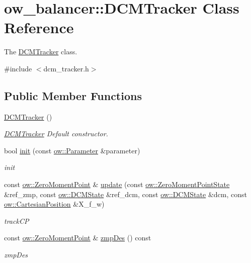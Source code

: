 \hypertarget{classow__balancer_1_1DCMTracker}{}\section{ow\+\_\+balancer\+:\+:D\+C\+M\+Tracker Class Reference}
\label{classow__balancer_1_1DCMTracker}


The \hyperlink{classow__balancer_1_1DCMTracker}{D\+C\+M\+Tracker} class.  




{\ttfamily \#include $<$dcm\+\_\+tracker.\+h$>$}

\subsection*{Public Member Functions}
\begin{DoxyCompactItemize}
\item 
\hyperlink{classow__balancer_1_1DCMTracker_a07ed7819c7459f06b6b33d957c230cdb}{D\+C\+M\+Tracker} ()\hypertarget{classow__balancer_1_1DCMTracker_a07ed7819c7459f06b6b33d957c230cdb}{}\label{classow__balancer_1_1DCMTracker_a07ed7819c7459f06b6b33d957c230cdb}

\begin{DoxyCompactList}\small\item\em \hyperlink{classow__balancer_1_1DCMTracker}{D\+C\+M\+Tracker} Default constructor. \end{DoxyCompactList}\item 
bool \hyperlink{classow__balancer_1_1DCMTracker_a7ed7f64b3d05d2636593c9e9270b73ce}{init} (const \hyperlink{classow_1_1Parameter}{ow\+::\+Parameter} \&parameter)
\begin{DoxyCompactList}\small\item\em init \end{DoxyCompactList}\item 
const \hyperlink{classow__core_1_1ZeroMomentPoint}{ow\+::\+Zero\+Moment\+Point} \& \hyperlink{classow__balancer_1_1DCMTracker_a179aaa28e4043340bdd58e7e6585df6c}{update} (const \hyperlink{classow__core_1_1ZeroMomentPointState}{ow\+::\+Zero\+Moment\+Point\+State} \&ref\+\_\+zmp, const \hyperlink{classow__core_1_1DivergentComponentOfMotionState}{ow\+::\+D\+C\+M\+State} \&ref\+\_\+dcm, const \hyperlink{classow__core_1_1DivergentComponentOfMotionState}{ow\+::\+D\+C\+M\+State} \&dcm, const \hyperlink{classow__core_1_1CartesianPosition}{ow\+::\+Cartesian\+Position} \&X\+\_\+f\+\_\+w)
\begin{DoxyCompactList}\small\item\em track\+CP \end{DoxyCompactList}\item 
const \hyperlink{classow__core_1_1ZeroMomentPoint}{ow\+::\+Zero\+Moment\+Point} \& \hyperlink{classow__balancer_1_1DCMTracker_a208a539a119f7f3623a77ef2ad8d8f35}{zmp\+Des} () const 
\begin{DoxyCompactList}\small\item\em zmp\+Des \end{DoxyCompactList}\end{DoxyCompactItemize}

